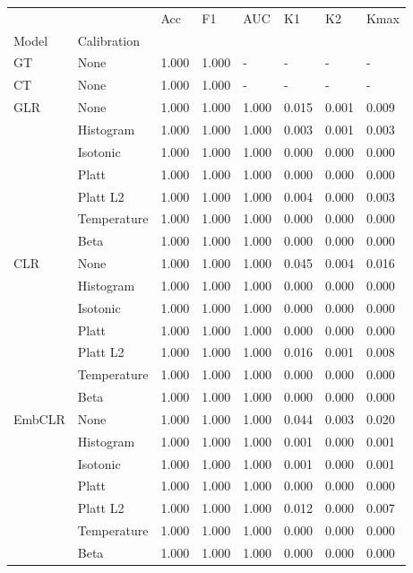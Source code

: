 \begin{tabular}{llllllll}
\toprule
 &  & Acc & F1 & AUC & K1 & K2 & Kmax \\
Model & Calibration &  &  &  &  &  &  \\
\midrule
GT & None & 1.000 & 1.000 & - & - & - & - \\
\cline{1-8}
CT & None & 1.000 & 1.000 & - & - & - & - \\
\cline{1-8}
\multirow[t]{7}{*}{GLR} & None & 1.000 & 1.000 & 1.000 & 0.015 & 0.001 & 0.009 \\
 & Histogram & 1.000 & 1.000 & 1.000 & 0.003 & 0.001 & 0.003 \\
 & Isotonic & 1.000 & 1.000 & 1.000 & 0.000 & 0.000 & 0.000 \\
 & Platt & 1.000 & 1.000 & 1.000 & 0.000 & 0.000 & 0.000 \\
 & Platt L2 & 1.000 & 1.000 & 1.000 & 0.004 & 0.000 & 0.003 \\
 & Temperature & 1.000 & 1.000 & 1.000 & 0.000 & 0.000 & 0.000 \\
 & Beta & 1.000 & 1.000 & 1.000 & 0.000 & 0.000 & 0.000 \\
\cline{1-8}
\multirow[t]{7}{*}{CLR} & None & 1.000 & 1.000 & 1.000 & 0.045 & 0.004 & 0.016 \\
 & Histogram & 1.000 & 1.000 & 1.000 & 0.000 & 0.000 & 0.000 \\
 & Isotonic & 1.000 & 1.000 & 1.000 & 0.000 & 0.000 & 0.000 \\
 & Platt & 1.000 & 1.000 & 1.000 & 0.000 & 0.000 & 0.000 \\
 & Platt L2 & 1.000 & 1.000 & 1.000 & 0.016 & 0.001 & 0.008 \\
 & Temperature & 1.000 & 1.000 & 1.000 & 0.000 & 0.000 & 0.000 \\
 & Beta & 1.000 & 1.000 & 1.000 & 0.000 & 0.000 & 0.000 \\
\cline{1-8}
\multirow[t]{7}{*}{EmbCLR} & None & 1.000 & 1.000 & 1.000 & 0.044 & 0.003 & 0.020 \\
 & Histogram & 1.000 & 1.000 & 1.000 & 0.001 & 0.000 & 0.001 \\
 & Isotonic & 1.000 & 1.000 & 1.000 & 0.001 & 0.000 & 0.001 \\
 & Platt & 1.000 & 1.000 & 1.000 & 0.000 & 0.000 & 0.000 \\
 & Platt L2 & 1.000 & 1.000 & 1.000 & 0.012 & 0.000 & 0.007 \\
 & Temperature & 1.000 & 1.000 & 1.000 & 0.000 & 0.000 & 0.000 \\
 & Beta & 1.000 & 1.000 & 1.000 & 0.000 & 0.000 & 0.000 \\
\cline{1-8}
\bottomrule
\end{tabular}
